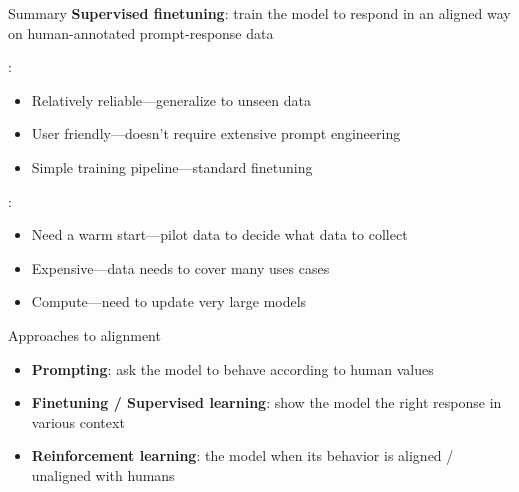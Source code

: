 \documentclass[usenames,dvipsnames,notes,11pt,aspectratio=169,hyperref={colorlinks=true, linkcolor=blue}]{beamer}
\begin{document}
\begin{frame}
    {Summary}
    \textbf{Supervised finetuning}: train the model to respond in an aligned way on human-annotated prompt-response data 

    :\\
    \begin{itemize}
        \item Relatively reliable---generalize to unseen data
        \item User friendly---doesn't require extensive prompt engineering
        \item Simple training pipeline---standard finetuning
    \end{itemize}

    \pause
    :\\
    \begin{itemize}
        \item Need a warm start---pilot data to decide what data to collect
        \item Expensive---data needs to cover many uses cases 
        \item Compute---need to update very large models 
    \end{itemize}
\end{frame}

\begin{frame}
    {Approaches to alignment}
    \begin{itemize}
        \itemsep1em
            
        \item \textcolor<2->{fg!20}{\textbf{Prompting}: {ask} the model to behave according to human values}
        \item \textcolor<2->{fg!20}{\textbf{Finetuning / Supervised learning}: {show} the model the right response in various context
        }
        \item \textbf{Reinforcement learning}:  the model when its behavior is aligned / unaligned with humans 
    \end{itemize}
\end{frame}
\end{document}
